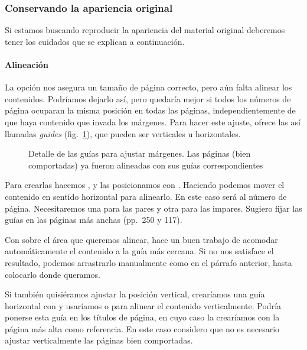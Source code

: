 \documentclass[%
	a5paper,
	10pt,
	twoside,
	openright,
	final,
]{memoir}
\begin{document}
	\subsubsection{Conservando la apariencia original\label{sec:STmarginsOriginals}} Si estamos buscando reproducir la apariencia del material original deberemos tener los cuidados que se explican a continuación.

	\paragraph{Alineación} La opción  nos asegura un tamaño de página correcto, pero aún falta alinear los contenidos. Podríamos dejarlo así, pero quedaría mejor si todos los números de página ocuparan la misma posición en todas las páginas, independientemente de que haya contenido que invada los márgenes. Para hacer este ajuste, \scantailorAdvanced ofrece las así llamadas \emph{guides} (fig.~\ref{fig:STmarginsGuides}), que pueden ser verticales u horizontales.

	\begin{figure}
		\tiny
		\def\svgwidth{\linewidth}
		\def\svgwidth{\linewidth}
		\caption[Detalle de las guías para ajustar márgenes]{Detalle de las guías para ajustar márgenes. Las páginas (bien comportadas) ya fueron alineadas con sus guías correspondientes\label{fig:STmarginsGuides}}
	\end{figure}

	Para crearlas hacemos , y las posicionamos con . Haciendo  podemos mover el contenido en sentido horizontal para alinearlo. En este caso será al número de página. Necesitaremos una para las pares y otra para las impares. Sugiero fijar las guías en las páginas más anchas (pp.~250 y 117).

	Con \keys{\shift + \,\leftclick\,\leftclick} sobre el área que queremos alinear, \scantailor hace un buen trabajo de acomodar automáticamente el contenido a la guía más cercana. Si no nos satisface el resultado, podemos arrastrarlo manualmente como en el párrafo anterior, hasta colocarlo donde queramos.

	Si también quisiéramos ajustar la posición vertical, crearíamos una guía horizontal con  y usaríamos \keys{\ctrl + \,\leftclick\,\leftclick} o  para alinear el contenido verticalmente. Podría ponerse esta guía en los títulos de página, en cuyo caso la crearíamos con la página más alta como referencia. En este caso considero que no es necesario ajustar verticalmente las páginas bien comportadas.
\end{document}
